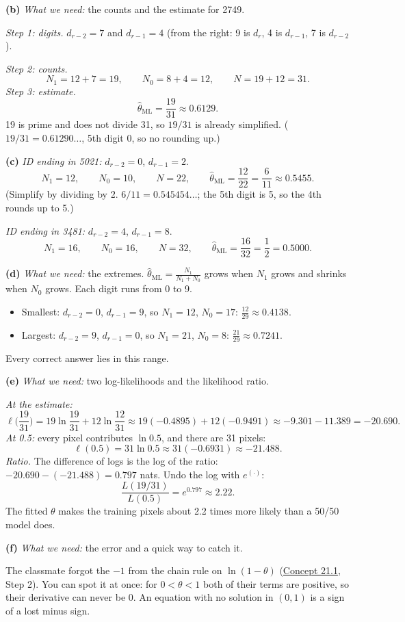 \documentclass[12pt,a4paper]{article}
\begin{document}
\textbf{(b)} \emph{What we need:} the counts and the estimate for 2749.

\emph{Step 1: digits.} $d_{r-2}=7$ and $d_{r-1}=4$ (from the right: 9 is $d_r$, 4 is $d_{r-1}$, 7 is $d_{r-2}$).

\emph{Step 2: counts.}
\[
N_1=12+7=19,\qquad N_0=8+4=12,\qquad N=19+12=31 .
\]
\emph{Step 3: estimate.}
\[
\hat\theta_{\text{ML}}=\frac{19}{31}\approx0.6129 .
\]
19 is prime and does not divide 31, so $19/31$ is already simplified. ($19/31=0.61290\dots$, 5th digit 0, so no rounding up.)

\textbf{(c)} \emph{ID ending in 5021:} $d_{r-2}=0$, $d_{r-1}=2$.
\[
N_1=12,\qquad N_0=10,\qquad N=22,\qquad \hat\theta_{\text{ML}}=\frac{12}{22}=\frac{6}{11}\approx0.5455 .
\]
(Simplify by dividing by 2. $6/11=0.545454\dots$; the 5th digit is 5, so the 4th rounds up to 5.)

\emph{ID ending in 3481:} $d_{r-2}=4$, $d_{r-1}=8$.
\[
N_1=16,\qquad N_0=16,\qquad N=32,\qquad \hat\theta_{\text{ML}}=\frac{16}{32}=\frac12=0.5000 .
\]

\textbf{(d)} \emph{What we need:} the extremes. $\hat\theta_{\text{ML}}=\frac{N_1}{N_1+N_0}$ grows when $N_1$ grows and shrinks when $N_0$ grows. Each digit runs from 0 to 9.
\begin{itemize}[nosep]
  \item Smallest: $d_{r-2}=0$, $d_{r-1}=9$, so $N_1=12$, $N_0=17$: $\frac{12}{29}\approx0.4138$.
  \item Largest: $d_{r-2}=9$, $d_{r-1}=0$, so $N_1=21$, $N_0=8$: $\frac{21}{29}\approx0.7241$.
\end{itemize}
Every correct answer lies in this range.

\textbf{(e)} \emph{What we need:} two log-likelihoods and the likelihood ratio.

\emph{At the estimate:}
\[
\ell\Big(\frac{19}{31}\Big)=19\ln\frac{19}{31}+12\ln\frac{12}{31}\approx19(-0.4895)+12(-0.9491)\approx-9.301-11.389=-20.690 .
\]
\emph{At 0.5:} every pixel contributes $\ln0.5$, and there are 31 pixels:
\[
\ell(0.5)=31\ln0.5\approx31(-0.6931)\approx-21.488 .
\]
\emph{Ratio.} The difference of logs is the log of the ratio: $-20.690-(-21.488)=0.797$ nats. Undo the log with $e^{(\cdot)}$:
\[
\frac{L(19/31)}{L(0.5)}=e^{0.797}\approx2.22 .
\]
The fitted $\theta$ makes the training pixels about 2.2 times more likely than a 50/50 model does.

\textbf{(f)} \emph{What we need:} the error and a quick way to catch it.

The classmate forgot the $-1$ from the chain rule on $\ln(1-\theta)$ (\hyperref[c21-1]{Concept 21.1}, Step 2). You can spot it at once: for $0<\theta<1$ both of their terms are positive, so their derivative can never be 0. An equation with no solution in $(0,1)$ is a sign of a lost minus sign.
\end{document}
